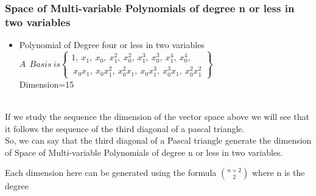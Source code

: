 \documentclass{beamer}
\begin{document}
\begin{frame}
\frametitle{Space of Multi-variable Polynomials of degree n or less in two variables}
\begin{block}{}

\begin{itemize} 
\item Polynomial of Degree four or less in two variables 
$A~~Basis ~is \begin{Bmatrix}1,~ x_1,~ x_0,~ x_1^2,~ x_0^2,~ x_1^3,~ x_0^3,~ x_1^4,~ x_0^4,\\~ x_0x_1,~ x_0x_1^2,~ x_0^2x_1,~ x_0x_1^3,~ x_0^3x_1,~ x_0^2x_1^2
\end{Bmatrix}$\\
Dimension=15\\
\end{itemize}
\\
If we study the sequence the dimension of the vector space above we will see that it follows the sequence of the third diagonal of a pascal triangle.\\
So, we can say that the third diagonal of a Pascal triangle generate the dimension of Space of Multi-variable Polynomials of degree n or less in two variables.

Each dimension here can be generated using the formula $n+2 \choose 2$ where n is the degree
\end{block}
\end{frame}
\end{document}

